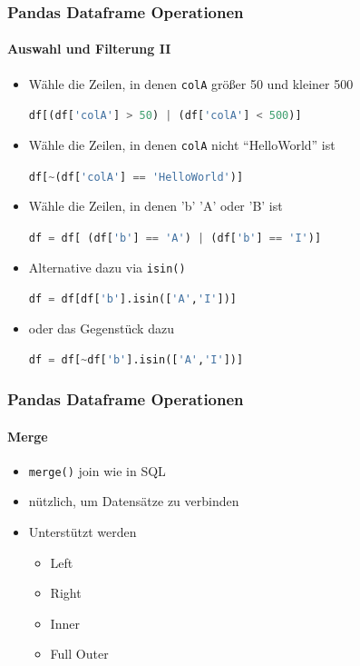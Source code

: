 \documentclass[12pt,ngerman]{beamer}
\newcommand{\pp}[1]{\lstinline[language={Python}]{#1}}
\begin{document}
\begin{frame}[fragile]
\frametitle{Pandas Dataframe Operationen}
\framesubtitle{Auswahl und Filterung II}

\begin{itemize}
\item Wähle die Zeilen, in denen \texttt{colA} größer 50 und kleiner 500

\pp{df[(df['colA'] > 50) | (df['colA'] < 500)]}

\item Wähle die Zeilen, in denen \texttt{colA} nicht \enquote{HelloWorld} ist

\pp{df[~(df['colA'] == 'HelloWorld')]}

\item Wähle die Zeilen, in denen 'b' 'A' oder 'B' ist

\pp{df = df[ (df['b'] == 'A') | (df['b'] == 'I')]}

\item Alternative dazu via \pp{isin()}

\pp{df = df[df['b'].isin(['A','I'])]}

\item oder das Gegenstück dazu

\pp{df = df[~df['b'].isin(['A','I'])]}

\end{itemize}
\end{frame}


\begin{frame}[fragile]
\frametitle{Pandas Dataframe Operationen}
\framesubtitle{Merge}

\begin{itemize}
\item \texttt{merge()} join wie in SQL
\item nützlich, um Datensätze zu verbinden
\item Unterstützt werden
\begin{itemize}
	\item Left
	\item Right
	\item Inner
	\item Full Outer
\end{itemize}
\end{itemize}

\end{frame}
\end{document}
